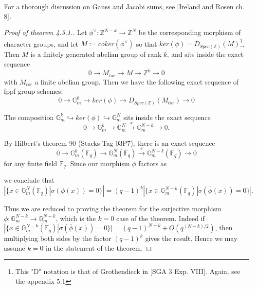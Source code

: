 \documentclass{ucbthesis}
\theoremstyle{definition}
\theoremstyle{theorem}
\begin{document}
For a thorough discussion on Gauss and Jacobi sums, see [Ireland and Rosen ch. 8]. 

\begin{proof}[Proof of theorem 4.3.1.]
Let $\phi^{\vee}:\mathbb{Z}^{N-k} \rightarrow \mathbb{Z}^{N}$ be the corresponding morphism of character
 groups, and let $M:= coker(\phi^{\vee})$ so that $ker(\phi) = D_{Spec(\mathbb{Z})}(M)$\footnote{ This "D" notation is that of Grothendieck in [SGA 3 Exp. VIII]. Again, see the appendix 5.1}. Then $M$ is a
  finitely generated abelian group of rank $k$, and sits inside the exact sequence 
$$0\rightarrow M_{tor} \rightarrow M \rightarrow \mathbb{Z}^{k} \rightarrow 0$$
with $M_{tor}$ a finite abelian group. Then we have the following exact sequence of fppf group schemes:
$$ 0 \rightarrow \mathbb{G}_{m}^{k} \rightarrow ker(\phi) \rightarrow D_{Spec(\mathbb{Z})}(M_{tor}) \rightarrow 0$$

The composition $\mathbb{G}_{m}^k \hookrightarrow ker(\phi) \hookrightarrow \mathbb{G}_{m}^{N}$ sits inside the exact sequence
$$0 \rightarrow \mathbb{G}_{m}^k \rightarrow  \mathbb{G}_{m}^N \xrightarrow{\pi} \mathbb{G}_{m}^{N-k} \rightarrow 0.$$

By Hilbert's theorem 90 (Stacks Tag 03P7), there is an exact sequence 
$$0 \rightarrow \mathbb{G}_{m}^k(\mathbb{F}_q) \rightarrow  \mathbb{G}_{m}^N(\mathbb{F}_q) \xrightarrow{\pi} \mathbb{G}_{m}^{N-k}(\mathbb{F}_q) \rightarrow 0$$
for any finite field $\mathbb{F}_q$. Since our morphism $\phi$ factors as 

\begin{center}
\end{center}

we conclude that 
$$|\{x\in \mathbb{G}_{m}^{N}(\mathbb{F}_q)|\sigma(\phi(x))=0\}| = (q-1)^{k}|\{x\in \mathbb{G}_{m}^{N-k}(\mathbb{F}_q)|\sigma(\overline{\phi}(x))=0\}|.$$

Thus we are reduced to proving the theorem for the surjective morphism $\overline{\phi}:\mathbb{G}_{m}^{N-k}\rightarrow \mathbb{G}_{m}^{N-k}$, which is the $k=0$ case of the theorem. Indeed if $|\{x\in \mathbb{G}_{m}^{N-k}(\mathbb{F}_q)|\sigma(\overline{\phi}(x))=0\}| = (q-1)^{N-k} + O(q^{(N-k)/2})$, then multiplying both sides by the factor $(q-1)^{k}$ gives the result. Hence we may assume $k=0$ in the statement of the theorem.


\end{proof}
\end{document}
